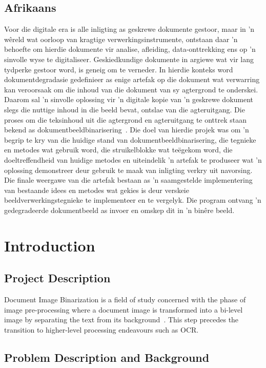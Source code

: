 \documentclass[a4paper, 12pt]{report}
\begin{document}
\section{Afrikaans}
Voor die digitale era is alle inligting as geskrewe dokumente gestoor, maar in
'n wêreld wat oorloop van kragtige verwerkingsinstrumente, ontstaan daar 'n
behoefte om hierdie dokumente vir analise, afleiding, data-onttrekking ens op
'n sinvolle wyse te digitaliseer. Geskiedkundige dokumente in argiewe wat vir
lang tydperke gestoor word, is geneig om te verneder. In hierdie konteks word
dokumentdegradasie gedefinieer as enige artefak op die dokument wat verwarring
kan veroorsaak om die inhoud van die dokument van sy agtergrond te onderskei.
Daarom sal 'n sinvolle oplossing vir 'n digitale kopie van 'n geskrewe dokument
slegs die nuttige inhoud in die beeld bevat, ontslae van die agteruitgang. Die
proses om die teksinhoud uit die agtergrond en agteruitgang te onttrek staan
bekend as dokumentbeeldbinarisering~\cite{su2012robust}. Die doel van hierdie
projek was om 'n begrip te kry van die huidige stand van
dokumentbeeldbinarisering, die tegnieke en metodes wat gebruik word, die
struikelblokke wat teëgekom word, die doeltreffendheid van huidige metodes en
uiteindelik 'n artefak te produseer wat 'n oplossing demonstreer deur gebruik
te maak van inligting verkry uit navorsing. Die finale weergawe van die artefak
bestaan as 'n saamgestelde implementering van bestaande idees en metodes wat
gekies is deur verskeie beeldverwerkingstegnieke te implementeer en te
vergelyk. Die program ontvang 'n gedegradeerde dokumentbeeld as invoer en
omskep dit in 'n binêre beeld.

\chapter{Introduction}

\section{Project Description}
Document Image Binarization is a field of study concerned with the phase of
image pre-processing where a document image is transformed into a bi-level
image by separating the text from its background~\cite{su2012robust}. This step
precedes the transition to higher-level processing endeavours such as OCR.

\section{Problem Description and Background}
\end{document}
